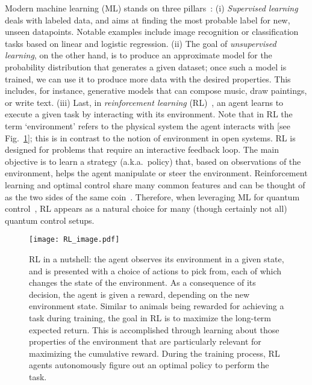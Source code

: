 Modern machine learning (ML) stands on three pillars~\cite{mehta2019high,carleo2019machine,carrasquilla2020machine,krenn2023artificial}:
(i) \textit{Supervised learning} deals with labeled data, and aims at finding the most probable label for new, unseen datapoints. Notable examples include image recognition or classification tasks based on linear and logistic regression. (ii) The goal of \textit{unsupervised learning}, on the other hand, is to produce an approximate model for the probability distribution that generates a given dataset; once such a model is trained, we can use it to produce more data with the desired properties. This includes, for instance, generative models that can compose music, draw paintings, or write text. (iii) Last, in \textit{reinforcement learning} (RL)~\cite{sutton_barto_rl}, an agent learns to execute a given task by interacting with its environment. 
Note that in RL the term `environment' refers to the physical system the agent interacts with [see Fig.~\ref{fig:RL-scheme}]; this is in contrast to the notion of environment in open systems.
RL is designed for problems that require an interactive feedback loop. The main objective is to learn a strategy (a.k.a.~policy) that, based on observations of the environment, helps the agent manipulate or steer the environment. Reinforcement learning and optimal control share many common features and can be thought of as the two sides of the same coin~\cite{todorov2006optimal}. Therefore, when leveraging ML for quantum control~\cite{ref5, ref6}, RL appears as a natural choice for many (though certainly not all) quantum control setups. 


\begin{figure}[h!]
\texttt{[image: RL\_image.pdf]}
\caption{
RL in a nutshell: the agent observes its environment in a given state, and is presented with a choice of actions to pick from, each of which changes the state of the environment. As a consequence of its decision, the agent is given a reward, depending on the new environment state. Similar to animals being rewarded for achieving a task during training, the goal in RL is to maximize the long-term expected return. This is accomplished through learning about those properties of the environment that are particularly relevant for maximizing the cumulative reward. During the training process, RL agents autonomously figure out an optimal policy to perform the task.
}
\label{fig:RL-scheme}
\end{figure}


